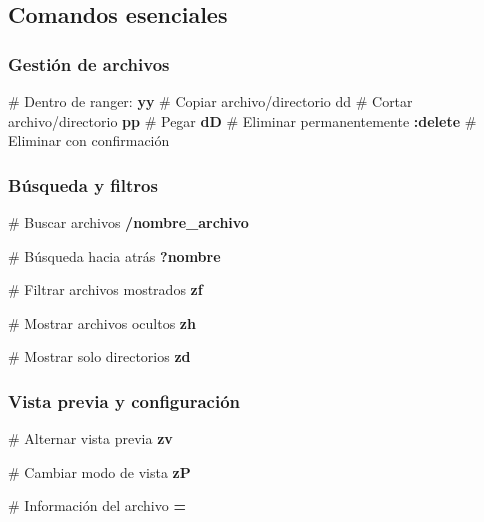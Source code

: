 \documentclass[
  11pt,
  letterpaper,
  oneside,
  openany]{scrbook}
\newenvironment{Shaded}{}{}
\newcommand{\CommentTok}[1]{\textcolor[rgb]{0.42,0.45,0.49}{#1}}
\newcommand{\ExtensionTok}[1]{\textcolor[rgb]{0.84,0.23,0.29}{\textbf{#1}}}
\newcommand{\FunctionTok}[1]{\textcolor[rgb]{0.44,0.26,0.76}{#1}}
\begin{document}
\subsection{Comandos esenciales}\label{comandos-esenciales}

\subsubsection{Gestión de archivos}\label{gestiuxf3n-de-archivos-1}

\begin{Shaded}
\begin{Highlighting}[]
\CommentTok{\# Dentro de ranger:}
\ExtensionTok{yy}    \CommentTok{\# Copiar archivo/directorio}
\FunctionTok{dd}    \CommentTok{\# Cortar archivo/directorio}
\ExtensionTok{pp}    \CommentTok{\# Pegar}
\ExtensionTok{dD}    \CommentTok{\# Eliminar permanentemente}
\ExtensionTok{:delete} \CommentTok{\# Eliminar con confirmación}
\end{Highlighting}
\end{Shaded}

\subsubsection{Búsqueda y filtros}\label{buxfasqueda-y-filtros}

\begin{Shaded}
\begin{Highlighting}[]
\CommentTok{\# Buscar archivos}
\ExtensionTok{/nombre\_archivo}

\CommentTok{\# Búsqueda hacia atrás}
\ExtensionTok{?nombre}

\CommentTok{\# Filtrar archivos mostrados}
\ExtensionTok{zf}

\CommentTok{\# Mostrar archivos ocultos}
\ExtensionTok{zh}

\CommentTok{\# Mostrar solo directorios}
\ExtensionTok{zd}
\end{Highlighting}
\end{Shaded}

\subsubsection{Vista previa y
configuración}\label{vista-previa-y-configuraciuxf3n}

\begin{Shaded}
\begin{Highlighting}[]
\CommentTok{\# Alternar vista previa}
\ExtensionTok{zv}

\CommentTok{\# Cambiar modo de vista}
\ExtensionTok{zP}

\CommentTok{\# Información del archivo}
\ExtensionTok{=}
\end{Highlighting}
\end{Shaded}
\end{document}

